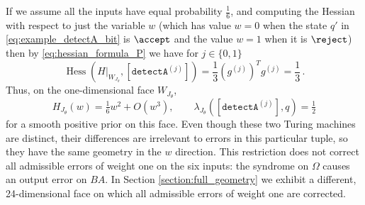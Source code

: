\documentclass[english,letter paper,12pt,reqno]{article}
\theoremstyle{definition}
\newcommand{\detectA}{\texttt{detectA}}
\def\be{\begin{equation}}
\def\ee{\end{equation}}
\begin{document}
If we assume all the inputs have equal probability $\tfrac{1}{6}$, and computing the Hessian with respect to just the variable $w$ (which has value $w = 0$ when the state $q'$ in \eqref{eq:example_detectA_bit} is $\accept$ and the value $w = 1$ when it is $\reject$) then by \eqref{eq:hessian_formula_P} we have for $j \in \{0,1\}$
\be
\operatorname{Hess}(H|_{W_{J_\theta}}, [\detectA^{(j)}]) = \frac{1}{3} (g^{(j)})^T g^{(j)} = \frac{1}{3}\,.
\ee
Thus, on the one-dimensional face $W_{J_\theta}$,
\[
H_{J_\theta}(w)=\tfrac16 w^2+O(w^3),\qquad \lambda_{J_\theta}([\detectA^{(j)}],q)=\tfrac12
\]
for a smooth positive prior on this face. Even though these two Turing machines are distinct, their differences are irrelevant to errors in this particular tuple, so they have the same geometry in the $w$ direction. This restriction does not correct all admissible errors of weight one on the six inputs: the syndrome on $\Omega$ causes an output error on $BA$. In Section \ref{section:full_geometry} we exhibit a different, 24-dimensional face on which all admissible errors of weight one are corrected.
\end{document}
